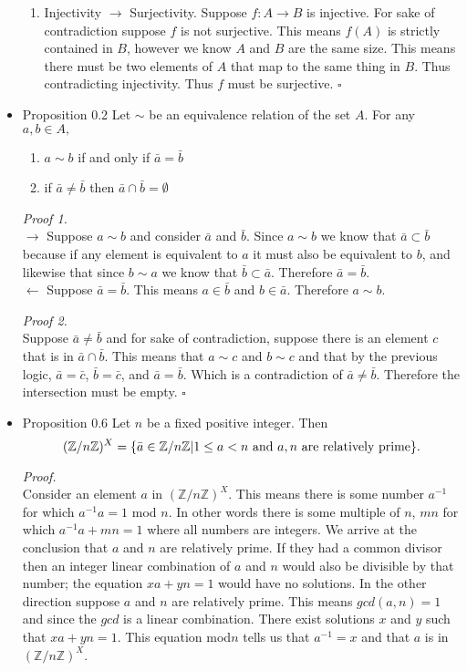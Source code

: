 \documentclass[12pt]{report}
\begin{document}
\begin{itemize}
\begin{enumerate}
\item Injectivity $\to$ Surjectivity. Suppose $f:A \to B$ is injective. For sake of contradiction suppose $f$ is not
      surjective. This means $f(A)$ is strictly contained in $B$, however we know $A$ and $B$ are the same size. This
      means there must be two elements of $A$ that map to the same thing in $B$. Thus contradicting injectivity. Thus
      $f$ must be surjective. $\square$\\
\end{enumerate}

\item Proposition 0.2 Let $\sim$ be an equivalence relation of the set $A$. For any $a,b \in A,$
\begin{enumerate}
  \item $a \sim b$ if and only if $\bar{a} = \bar{b}$
  \item if $\bar{a} \neq \bar{b}$ then $\bar{a} \cap \bar{b} = \emptyset$
\end{enumerate}

\textit{Proof 1.}\\
$\rightarrow$ Suppose $a\sim b$ and consider $\bar{a}$ and $\bar{b}$. Since $a \sim b$ we know that $\bar{a} \subset \bar{b}$
              because if any element is equivalent to $a$ it must also be equivalent to $b$, and likewise that since
              $b \sim a$ we know that $\bar{b} \subset \bar{a}$. Therefore $\bar{a} = \bar{b}$.\\
$\leftarrow$ Suppose $\bar{a} = \bar{b}$. This means $a \in \bar{b}$ and $b \in \bar{a}$. Therefore $a \sim b$.

\textit{Proof 2.}\\
Suppose $\bar{a} \neq \bar{b}$ and for sake of contradiction, suppose there is an element $c$ that is in $\bar{a} \cap
\bar{b}$. This means that $a \sim c$ and $b \sim c$ and that by the previous logic, $\bar{a} = \bar{c}$, $\bar{b}= \bar{c}$,
and $\bar{a} = \bar{b}$. Which is a contradiction of $\bar{a} \neq \bar{b}$. Therefore the intersection must be empty.
$\square$\\

\item Proposition 0.6 Let $n$ be a fixed positive integer. Then $$(\mathbb{Z}/n\mathbb{Z})^X = \{\bar{a} \in
      \mathbb{Z}/n\mathbb{Z}|1 \leq a < n \textnormal{ and $a,n$ are relatively prime}\}.$$

\textit{Proof.}\\
Consider an element $a$ in $(\mathbb{Z}/n\mathbb{Z})^X$. This means there is some number $a^{-1}$ for which
$a^{-1}a = 1$ mod $n$. In other words there is some multiple of $n$, $mn$ for which $a^{-1}a + mn = 1$ where all numbers
are integers. We arrive at the conclusion that $a$ and $n$ are relatively prime. If they had a common divisor then an
integer linear combination of $a$ and $n$ would also be divisible by that number; the equation $xa + yn = 1$ would have
no solutions. In the other direction suppose $a$ and $n$ are relatively prime. This means $gcd(a,n) = 1$ and since the
$gcd$ is a linear combination. There exist solutions $x$ and $y$ such that $xa + yn = 1$. This equation mod$n$ tells us
that $a^{-1} = x$ and that $a$ is in $(\mathbb{Z}/n\mathbb{Z})^X$.


\end{itemize}
\end{document}
